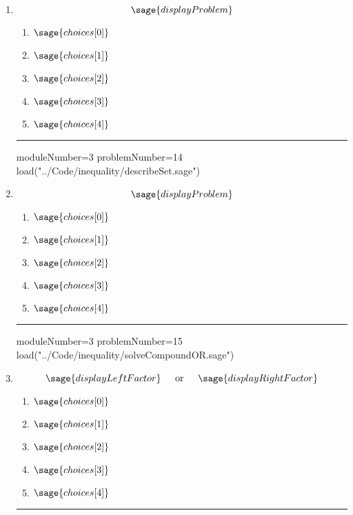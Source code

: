 \documentclass[14pt]{article}
\newcommand{\litem}[1]{\item#1\hspace*{-1cm}\rule{\textwidth}{0.4pt}}
\begin{document}
\begin{enumerate}
\litem{ 

\[ \sage{displayProblem} \]

	\begin{enumerate}[label=\Alph*.]
    \item \( \sage{choices[0]} \)
    \item \( \sage{choices[1]} \)
    \item \( \sage{choices[2]} \)
    \item \( \sage{choices[3]} \)
    \item \( \sage{choices[4]} \)
	\end{enumerate}

}

\begin{sagesilent}
moduleNumber=3
problemNumber=14
load("../Code/inequality/describeSet.sage")
\end{sagesilent}
\litem{ 

\[ \sage{displayProblem} \]

	\begin{enumerate}[label=\Alph*.]
		\item \( \sage{choices[0]} \)
		\item \( \sage{choices[1]} \)
		\item \( \sage{choices[2]} \)
		\item \( \sage{choices[3]} \)
    \item \( \sage{choices[4]} \)
	\end{enumerate}

}

\begin{sagesilent}
moduleNumber=3
problemNumber=15
load("../Code/inequality/solveCompoundOR.sage")
\end{sagesilent}

\litem{ 
	\[ \sage{displayLeftFactor} \hspace*{4mm} \text{ or } \hspace*{4mm} \sage{displayRightFactor} \]

	\begin{enumerate}[label=\Alph*.]
    \item \( \sage{choices[0]} \)
    \item \( \sage{choices[1]} \)
    \item \( \sage{choices[2]} \)
    \item \( \sage{choices[3]} \)
    \item \( \sage{choices[4]} \)
	\end{enumerate}

}

\end{enumerate}
\end{document}
